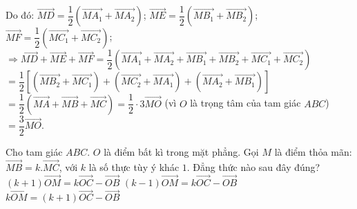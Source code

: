 \begin{ex}
{{
		}
		Do đó: $\vec{MD}=\dfrac{1}{2}\left(\vec{MA_1}+\vec{MA_2}\right)$;
		$\vec{ME}=\dfrac{1}{2}\left(\vec{MB_1}+\vec{MB_2}\right)$;
		$\vec{MF}=\dfrac{1}{2}\left(\vec{MC_1}+\vec{MC_2}\right)$;\\
		$\Rightarrow\vec{MD}+\vec{ME}+\vec{MF}=\dfrac{1}{2}\left(\vec{MA_1}+\vec{MA_2}+\vec{MB_1}+\vec{MB_2}+\vec{MC_1}+\vec{MC_2}\right)$\\
		$=\dfrac{1}{2}\left[\left(\vec{MB_2}+\vec{MC_1}\right)+\left(\vec{MC_2}+\vec{MA_1}\right)+\left(\vec{MA_2}+\vec{MB_1}\right)\right]$\\
		$=\dfrac{1}{2}\left(\vec{MA}+\vec{MB}+\vec{MC}\right)=\dfrac{1}{2}\cdot3\vec{MO}$ (vì $O$ là trọng tâm của tam giác $ABC$)\\
		$=\dfrac{3}{2}\vec{MO}$.
	}
\end{ex}

\begin{ex}%
	Cho tam giác $ABC$. $O$ là điểm bất kì trong mặt phẳng. Gọi $M$ là điểm thỏa mãn: $\vec{MB}=k.\vec{MC}$, với $k$ là số thực tùy ý khác $1$. Đẳng thức nào sau đây đúng?
	{$(k+1)\vec{OM}=k\vec{OC}-\vec{OB}$}
	{\True$(k-1)\vec{OM}=k\vec{OC}-\vec{OB}$}
	{$k\vec{OM}=(k+1)\vec{OC}-\vec{OB}$}
\end{ex}

